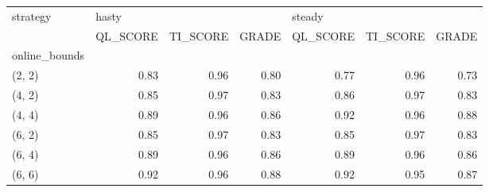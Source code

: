 \begin{tabular}{lrrrrrr}
\toprule
strategy & \multicolumn{3}{l}{hasty} & \multicolumn{3}{l}{steady} \\
{} & QL\_SCORE & TI\_SCORE & GRADE & QL\_SCORE & TI\_SCORE & GRADE \\
online\_bounds &          &          &       &          &          &       \\
\midrule
(2, 2)        &     0.83 &     0.96 &  0.80 &     0.77 &     0.96 &  0.73 \\
(4, 2)        &     0.85 &     0.97 &  0.83 &     0.86 &     0.97 &  0.83 \\
(4, 4)        &     0.89 &     0.96 &  0.86 &     0.92 &     0.96 &  0.88 \\
(6, 2)        &     0.85 &     0.97 &  0.83 &     0.85 &     0.97 &  0.83 \\
(6, 4)        &     0.89 &     0.96 &  0.86 &     0.89 &     0.96 &  0.86 \\
(6, 6)        &     0.92 &     0.96 &  0.88 &     0.92 &     0.95 &  0.87 \\
\bottomrule
\end{tabular}
